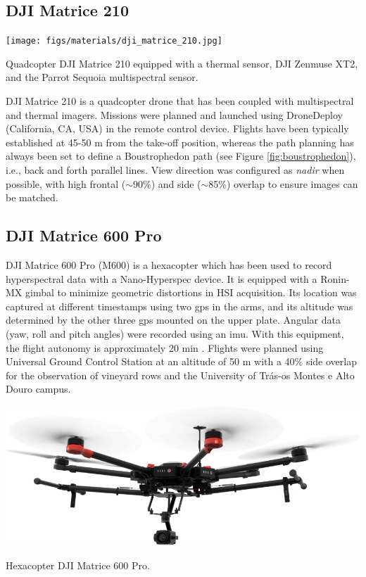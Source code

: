 \subsection{DJI Matrice 210}

\begin{marginfigure}[0.1cm]
	\texttt{[image: figs/materials/dji\_matrice\_210.jpg]}
	\caption{Quadcopter DJI Matrice 210 equipped with a thermal sensor, DJI Zenmuse XT2, and the Parrot Sequoia multispectral sensor.}
    \label{fig:dji_matrice_210}
\end{marginfigure}
DJI Matrice 210 is a quadcopter drone that has been coupled with multispectral and thermal imagers. Missions were planned and launched using DroneDeploy (California, CA, USA) in the remote control device. Flights have been typically established at 45-50 \si{\meter} from the take-off position, whereas the path planning has always been set to define a Boustrophedon path (see Figure \ref{fig:boustrophedon}), i.e., back and forth parallel lines. View direction was configured as \textit{nadir} when possible, with high frontal ($\sim$90\%) and side ($\sim$85\%) overlap to ensure images can be matched.

\subsection{DJI Matrice 600 Pro}

DJI Matrice 600 Pro (M600) is a hexacopter which has been used to record hyperspectral data with a Nano-Hyperspec device. It is equipped with a Ronin-MX gimbal to minimize geometric distortions in HSI acquisition. Its location was captured at different timestamps using two \acrshort{gps} in the arms, and its altitude was determined by the other three \acrshort{gps} mounted on the upper plate. Angular data (yaw, roll and pitch angles) were recorded using an \acrshort{imu}. With this equipment, the flight autonomy is approximately 20 \si{\minute} \cite{sousa_uav-based_2022}. Flights were planned using Universal Ground Control Station at an altitude of 50 \si{\meter} with a 40\% side overlap for the observation of vineyard rows and the University of Trás-os Montes e Alto Douro campus.
\begin{marginfigure}[-3.0cm]
	\includegraphics{figs/materials/dji_matrice_600_pro.png}
	\caption{Hexacopter DJI Matrice 600 Pro.}
	\label{fig:dji_matrice_600_pro}
\end{marginfigure}

